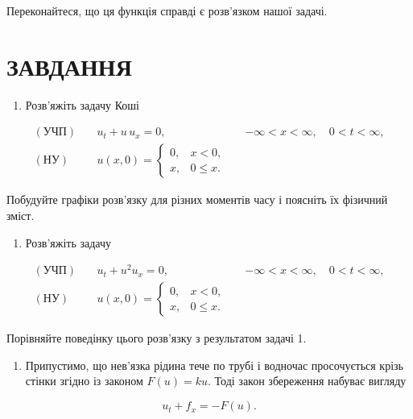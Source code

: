 \documentclass[
  ukrainian,
]{article}
\providecommand{\tightlist}{%
  \setlength{\itemsep}{0pt}\setlength{\parskip}{0pt}}
\begin{document}
Переконайтеся, що ця функція справді є розв'язком нашої задачі.

\section{ЗАВДАННЯ}\label{ux437ux430ux432ux434ux430ux43dux43dux44f-18}

\begin{enumerate}
\def\labelenumi{\arabic{enumi}.}
\tightlist
\item
  Розв'яжіть задачу Коші
\end{enumerate}

\[
\begin{aligned}
(\text{УЧП})\quad & u_t + u\,u_x = 0, && -\infty < x < \infty,\quad 0 < t < \infty, \\
(\text{НУ})\quad &
u(x,0)=
\begin{cases}
0, & x < 0,\\
x, & 0 \le x.
\end{cases}
\end{aligned}
\]

Побудуйте графіки розв'язку для різних моментів часу і поясніть їх
фізичний зміст.

\begin{enumerate}
\def\labelenumi{\arabic{enumi}.}
\setcounter{enumi}{1}
\tightlist
\item
  Розв'яжіть задачу
\end{enumerate}

\[
\begin{aligned}
(\text{УЧП})\quad & u_t + u^2 u_x = 0, && -\infty < x < \infty,\quad 0 < t < \infty, \\
(\text{НУ})\quad &
u(x,0)=
\begin{cases}
0, & x < 0,\\
x, & 0 \le x.
\end{cases}
\end{aligned}
\]

Порівняйте поведінку цього розв'язку з результатом задачі 1.

\begin{enumerate}
\def\labelenumi{\arabic{enumi}.}
\setcounter{enumi}{2}
\tightlist
\item
  Припустимо, що нев'язка рідина тече по трубі і водночас просочується
  крізь стінки згідно із законом \(F(u)=ku\). Тоді закон збереження
  набуває вигляду
\end{enumerate}

\[
u_t + f_x = -F(u).
\]
\end{document}
